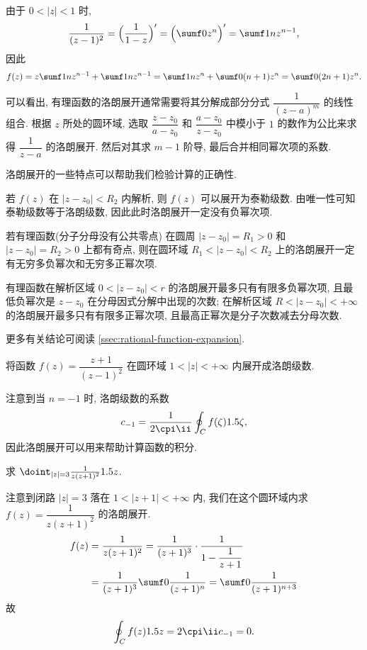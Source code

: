 \begin{solution}[另解]
  由于 $0<|z|<1$ 时,
  \[
     \frac{1}{(z-1)^2}
    =\Bigl(\frac1{1-z}\Bigr)'
    =\Bigl(\sumf0 z^n\Bigr)'
    =\sumf1 nz^{n-1},
  \]
  因此
  \[
     f(z)
    =z\sumf1 nz^{n-1}+\sumf1 nz^{n-1}
    =\sumf1 nz^n+\sumf0 (n+1)z^n
    =\sumf0 (2n+1)z^n.
  \]
\end{solution}

可以看出, 有理函数的洛朗展开通常需要将其分解成部分分式 $\dfrac1{(z-a)^m}$ 的线性组合.
根据 $z$ 所处的圆环域, 选取 $\dfrac{z-z_0}{a-z_0}$ 和 $\dfrac{a-z_0}{z-z_0}$ 中模小于 $1$ 的数作为公比来求得 $\dfrac1{z-a}$ 的洛朗展开.
然后对其求 $m-1$ 阶导, 最后合并相同幂次项的系数.

洛朗展开的一些特点可以帮助我们检验计算的正确性.
\begin{enumpar}
  \item 若 $f(z)$ 在 $|z-z_0|<R_2$ 内解析, 则 $f(z)$ 可以展开为泰勒级数. 由唯一性可知泰勒级数等于洛朗级数, 因此此时洛朗展开一定没有负幂次项.
  \item 若有理函数(分子分母没有公共零点) 在圆周 $|z-z_0|=R_1>0$ 和 $|z-z_0|=R_2>0$ 上都有奇点, 则在圆环域 $R_1<|z-z_0|<R_2$ 上的洛朗展开一定有无穷多负幂次和无穷多正幂次项.
  \item 有理函数在解析区域 $0<|z-z_0|<r$ 的洛朗展开最多只有有限多负幂次项, 且最低负幂次是 $z-z_0$ 在分母因式分解中出现的次数; 在解析区域 $R<|z-z_0|<+\infty$ 的洛朗展开最多只有有限多正幂次项, 且最高正幂次是分子次数减去分母次数.
\end{enumpar}

更多有关结论可阅读 \ref{ssec:rational-function-expansion}.

\begin{exercise}
  将函数 $f(z)=\dfrac{z+1}{(z-1)^2}$ 在圆环域 $1<|z|<+\infty$ 内展开成洛朗级数.
\end{exercise}

注意到当 $n=-1$ 时, 洛朗级数的系数
\[
  c_{-1}=\frac1{2\cpi\ii}\oint_C f(\zeta)\d\zeta,
\]
因此洛朗展开可以用来帮助计算函数的积分.

\begin{example}
  求 $\doint_{|z|=3}\frac1{z(z+1)^2}\d z$.
\end{example}

\begin{solution}
  注意到闭路 $|z|=3$ 落在 $1<|z+1|<+\infty$ 内, 我们在这个圆环域内求 $f(z)=\dfrac1{z(z+1)^2}$ 的洛朗展开.
  \begin{align*}
     f(z)&
    =\frac1{z(z+1)^2}=\frac1{(z+1)^3}\cdot\frac1{1-\dfrac1{z+1}}\\&
    =\frac1{(z+1)^3}\sumf0 \frac1{(z+1)^n}
    =\sumf0 \frac1{(z+1)^{n+3}}
  \end{align*}
  故
  \[
    \oint_Cf(z)\d z=2\cpi\ii  c_{-1}=0.
  \]
\end{solution}

